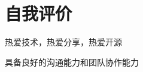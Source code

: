 \documentclass[]{deedy-resume-openfont}
\begin{document}
\begin{minipage}[t]{0.73\textwidth}

\section{自我评价}
\sectionsep
\begin{tightemize}
    \item 热爱技术，热爱分享，热爱开源
    \item 具备良好的沟通能力和团队协作能力
\end{tightemize}


% 
% 

\end{minipage} 
\end{document}

